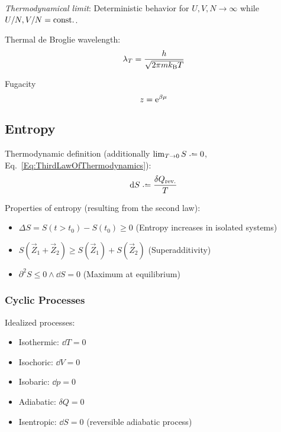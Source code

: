 		\emph{Thermodynamical limit}: \newline Deterministic behavior for $U,V,N \to \infty$ while $U/N,V/N=\mathrm{const.}$. \vsp

		\noindent
		Thermal de Broglie wavelength:
		\begin{equation}
			\label{Eq:ThermalDeBroglieWavelength}
			\lambda_T = \frac{h}{\sqrt{2\pi m k_{\text{B}} T}}
		\end{equation} \vsp

		\noindent
		Fugacity
		\begin{equation}
			z = \mathrm{e}^{\beta\mu}
		\end{equation} \vsp

	\subsection{Entropy}
		\noindent
		Thermodynamic definition (additionally $\lim_{T \to 0} S \defeq 0$, Eq.~\ref{Eq:ThirdLawOfThermodynamics}):
		\begin{equation}
			\dd S \defeq \frac{\delta Q_\text{rev.}}{T}
		\end{equation}

		\noindent
		Properties of entropy (resulting from the second law):
		\begin{itemize}\itemsep -0pt	%
			\item $\Delta S = S(t>t_0)-S(t_0) \ge 0$ \hfill{(Entropy increases in isolated systems)}
			\item $S(\vec{Z}_1 + \vec{Z}_2) \ge S(\vec{Z}_1) + S(\vec{Z}_2)$ \hfill{(Superadditivity)}
			\item $\partial^2 S \le 0 \wedge \dd{S} = 0$ \hfill{(Maximum at equilibrium)}
		\end{itemize}

		\subsubsection{Cyclic Processes}
			\noindent
			Idealized processes:
			\begin{itemize}
				\item Isothermic: $\dd T = 0$
				\item Isochoric: $\dd V = 0$
				\item Isobaric: $\dd p = 0$
				\item Adiabatic: $\delta Q = 0$
				\item Isentropic: $\dd S = 0$ (reversible adiabatic process)
			\end{itemize}

